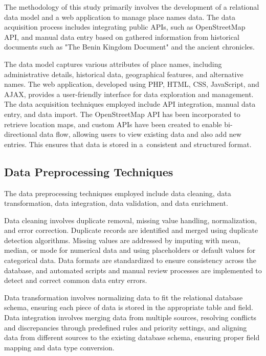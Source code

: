 The methodology of this study primarily involves the development of a relational data model and a web application to manage place names data. The data acquisition process includes integrating public APIs, such as OpenStreetMap API, and manual data entry based on gathered information from historical documents such as "The Benin Kingdom Document" and the ancient chronicles. 

The data model captures various attributes of place names, including administrative details, historical data, geographical features, and alternative names. The web application, developed using PHP, HTML, CSS, JavaScript, and AJAX, provides a user-friendly interface for data exploration and management. The data acquisition techniques employed include API integration, manual data entry, and data import. The OpenStreetMap API has been incorporated to retrieve location maps, and custom APIs have been created to enable bi-directional data flow, allowing users to view existing data and also add new entries. This ensures that data is stored in a~consistent and structured format. 


\subsection{Data Preprocessing Techniques}

The data preprocessing techniques employed include data cleaning, data transformation, data integration, data validation, and data enrichment.

Data cleaning involves duplicate removal, missing value handling, normalization, and error correction. Duplicate records are identified and merged using duplicate detection algorithms. Missing values are addressed by imputing with mean, median, or mode for numerical data and using placeholders or default values for categorical data. Data formats are standardized to ensure consistency across the database, and automated scripts and manual review processes are implemented to detect and correct common data entry errors.

Data transformation involves normalizing data to fit the relational database schema, ensuring each piece of data is stored in the appropriate table and field.  Data integration involves merging data from multiple sources, resolving conflicts and discrepancies through predefined rules and priority settings, and aligning data from different sources to the existing database schema, ensuring proper field mapping and data type conversion.

